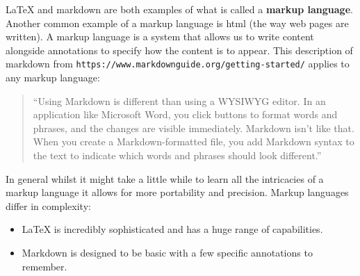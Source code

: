 \LaTeX\; and markdown are both examples of what is called a \textbf{markup language}.
Another common example of a markup language is html (the way web pages are
written).
A markup language is a system that allows us to write content alongside
annotations to specify how the content is to appear.
This description of markdown from
\texttt{https://www.markdownguide.org/getting-started/} applies
to any markup language:

\begin{quote}
``Using Markdown is different than using a WYSIWYG editor. In an application
like Microsoft Word, you click buttons to format words and phrases, and the
changes are visible immediately. Markdown isn’t like that. When you create a
Markdown-formatted file, you add Markdown syntax to the text to indicate which
words and phrases should look different.''
\end{quote}

In general whilst it might take a little while to learn all the intricacies of a
markup language it allows for more portability and precision.
Markup languages differ in complexity:

\begin{itemize}
\item 
\LaTeX\; is incredibly sophisticated and has a huge range of capabilities.

\item 
Markdown is designed to be basic with a few specific annotations to remember.

\end{itemize}
